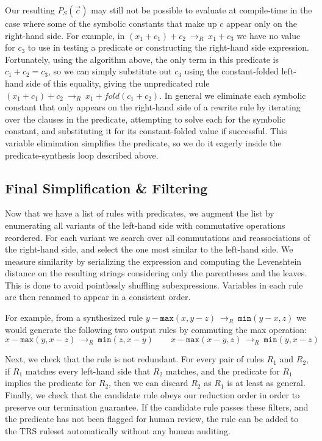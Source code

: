 \documentclass[acmsmall,review,anonymous]{acmart}\settopmatter{printfolios=true,printccs=false,printacmref=false}
\newcommand{\hmax}[0]{\texttt{max}}
\newcommand{\hmin}[0]{\texttt{min}}
\newcommand{\rewrites}[0]{\:\rightarrow_{R}\:}
\begin{document}
Our resulting $P_S(\vec{c})$ may still not be possible to evaluate at
compile-time in the case where some of the symbolic constants that
make up $c$ appear only on the right-hand side. For example, in $(x_1
+ c_1) + c_2 \rewrites x_1 + c_3$ we have no value for $c_3$ to use
in testing a predicate or constructing the right-hand side
expression. Fortunately, using the algorithm above, the only term in
this predicate is $c_1 + c_2 = c_3$, so we can simply substitute out
$c_3$ using the constant-folded left-hand side of this equality,
giving the unpredicated rule $(x_1 + c_1) + c_2 \rewrites x_1 +
fold(c_1 + c_2)$. In general we eliminate each symbolic constant that
only appears on the right-hand side of a rewrite rule by iterating
over the clauses in the predicate, attempting to solve each for the
symbolic constant, and substituting it for its constant-folded value
if successful. This variable elimination simplifies the predicate, so
we do it eagerly inside the predicate-synthesis loop described above.

\subsection{Final Simplification \& Filtering}

Now that we have a list of rules with predicates, we augment the list
by enumerating all variants of the left-hand side with commutative
operations reordered. For each variant we search over all commutations
and reassociations of the right-hand side, and select the one most
similar to the left-hand side. We measure similarity by serializing
the expression and computing the Levenshtein distance on the resulting
strings considering only the parentheses and the leaves. This is done
to avoid pointlessly shuffling subexpressions. Variables in each rule
are then renamed to appear in a consistent order.

For example, from a synthesized rule $y - \hmax(x, y - z) \rewrites \hmin(y - x, z)$ we would generate the following two
output rules by commuting the max operation:
\[
x - \hmax(y, x - z) \rewrites \hmin(z, x - y) \qquad x - \hmax(x - y, z) \rewrites \hmin(y, x - z)
\]

Next, we check that the rule is not redundant. For every pair of rules
$R_1$ and $R_2$, if $R_1$ matches every left-hand side that $R_2$
matches, and the predicate for $R_1$ implies the predicate for $R_2$,
then we can discard $R_2$ as $R_1$ is at least as general. Finally, we
check that the candidate rule obeys our reduction order in order to
preserve our termination guarantee. If the candidate rule passes these
filters, and the predicate has not been flagged for human review, the
rule can be added to the TRS ruleset automatically without any human
auditing.
\end{document}
